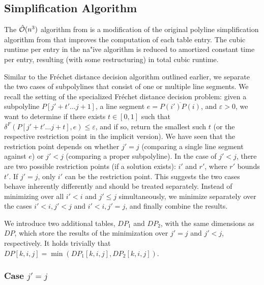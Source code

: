 \subsection{Simplification Algorithm}
\label{ssec:simplification_algo_cubic}

The \(\hat{\mathcal{O}}(n^3)\) algorithm from \citeauthor{polyline_simplification_has_cubic_complexity_bringmannetal} is a modification of the original polyline simplification algorithm from \citeauthor{on_optimal_polyline_simplification_using_the_hausdorff_and_frechet_distance} that improves the computation of each table entry. The cubic runtime per entry in the na"ive algorithm is reduced to amortized constant time per entry, resulting (with some restructuring) in total cubic runtime.

Similar to the Fréchet distance decision algorithm outlined earlier, we separate the two cases of subpolylines that consist of one or multiple line segments. We recall the setting of the specialized Fréchet distance decision problem: given a subpolyline \(P[j' + t' \dots j + 1]\), a line segment \(e = \overline{P(i')P(i)}\), and \(\varepsilon > 0\), we want to determine if there exists \(t \in [0, 1]\) such that \(\delta^F(P[j' + t' \dots j + t], e) \leq \varepsilon\), and if so, return the smallest such \(t\) (or the respective restriction point in the implicit version). We have seen that the restriction point depends on whether \(j' = j\) (comparing a single line segment against \(e\)) or \(j' < j\) (comparing a proper subpolyline).
In the case of \(j' < j\), there are two possible restriction points (if a solution exists): \(i'\) and \(r'\), where \(r'\) bounds \(t'\). If \(j' = j\), only \(i'\) can be the restriction point. This suggests the two cases behave inherently differently and should be treated separately. Instead of minimizing over all \(i' < i\) and \(j' \leq j\) simultaneously, we minimize separately over the cases \(i' < i, j' < j\) and \(i' < i, j' = j\), and finally combine the results.

We introduce two additional tables, \(DP_1\) and \(DP_2\), with the same dimensions as \(DP\), which store the results of the minimization over \(j'=j\) and \(j' < j\), respectively. It holds trivially that \(DP[k, i, j] = \min(DP_1[k,i,j], DP_2[k,i,j])\).

\subsubsection{Case \(j' = j\)}\label{ssec:cubic_eq}

